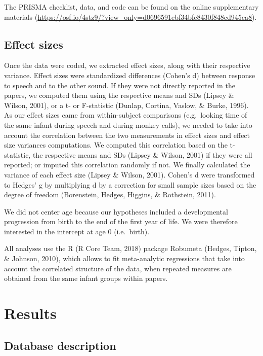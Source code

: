 \documentclass[man]{apa6}
\begin{document}
The PRISMA checklist, data, and code can be found on the online
supplementary materials
(\url{https://osf.io/4stz9/?view_only=d0696591ebf34bfc8430f848cd945ca8}).

\subsection{Effect sizes}\label{effect-sizes}

Once the data were coded, we extracted effect sizes, along with their
respective variance. Effect sizes were standardized differences (Cohen's
d) between response to speech and to the other sound. If they were not
directly reported in the papers, we computed them using the respective
means and SDs (Lipsey \& Wilson, 2001), or a t- or F-statistic (Dunlap,
Cortina, Vaslow, \& Burke, 1996). As our effect sizes came from
within-subject comparisons (e.g.~looking time of the same infant during
speech and during monkey calls), we needed to take into account the
correlation between the two measurements in effect sizes and effect size
variances computations. We computed this correlation based on the
t-statistic, the respective means and SDs (Lipsey \& Wilson, 2001) if
they were all reported; or imputed this correlation randomly if not. We
finally calculated the variance of each effect size (Lipsey \& Wilson,
2001). Cohen's d were transformed to Hedges' g by multiplying d by a
correction for small sample sizes based on the degree of freedom
(Borenstein, Hedges, Higgins, \& Rothstein, 2011).

We did not center age because our hypotheses included a developmental
progression from birth to the end of the first year of life. We were
therefore interested in the intercept at age 0 (i.e.~birth).

All analyses use the R (R Core Team, 2018) package Robumeta (Hedges,
Tipton, \& Johnson, 2010), which allows to fit meta-analytic regressions
that take into account the correlated structure of the data, when
repeated measures are obtained from the same infant groups within
papers.

\section{Results}\label{results}

\subsection{Database description}\label{database-description}
\end{document}
